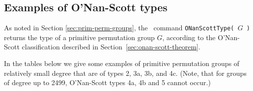 \subsection{Examples of O'Nan-Scott types}
\label{sec:examples-onan-scott}
As noted in Section \ref{sec:prim-perm-groups}, the \GAP\ command {\tt ONanScottType( $G$ )}
returns the type of a primitive permutation group $G$, according to the
O'Nan-Scott classification described in
Section~\ref{sec:onan-scott-theorem}. 

In the tables below we give some examples of primitive permutation groups of relatively
small degree that are of types 2, 3a, 3b, and 4c.
(Note, that for groups of degree up to 2499, O'Nan-Scott types 4a, 4b and 5
cannot occur.)

\begin{center}
  

\end{center}
